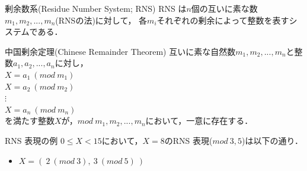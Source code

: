 \documentclass[dvipdfmx]{beamer}
\begin{document}
\begin{frame}[noframenumbering]{剰余数系(Residue Number System; RNS)}
\thispagestyle{empty}
RNS は$n$個の互いに素な数$m_1,m_2,...,m_n$(RNSの法)に対して，
各$m_i$それぞれの剰余によって整数を表すシステムである．
\begin{block}{中国剰余定理(Chinese Remainder Theorem)}
互いに素な自然数$m_1,m_2,...,m_n$と整数$a_1,a_2,...,a_n$に対し，\\
{\centering
 $X = a_1\ (mod\ m_1)$\\
 $X = a_2\ (mod\ m_2)$\\
 $\vdots$\\
 $X = a_n\ (mod\ m_n)$\\
}
を満たす整数$X$が，$mod\ m_1,m_2,...,m_n$において，一意に存在する．
\end{block}

\begin{exampleblock}{RNS 表現の例}
 $0 \leq X < 15$において，$X = 8$のRNS 表現($mod\ 3,5$)は以下の通り．\\
 \begin{itemize}
  \item $X = (\ 2\ (mod\ 3),\ 3\ (mod\ 5)\ )$
 \end{itemize}
\end{exampleblock}

\end{frame}
\end{document}
